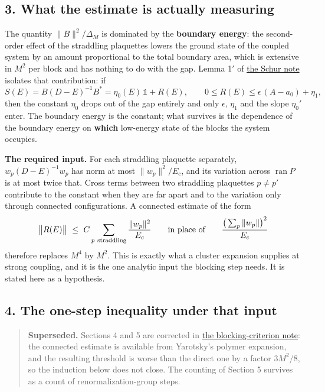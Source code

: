 \documentclass[11pt,a4paper]{article}
\begin{document}
\hypertarget{what-the-estimate-is-actually-measuring}{%
\subsection{3. What the estimate is actually
measuring}\label{what-the-estimate-is-actually-measuring}}

The quantity \(\|B\|^2/\Delta_M\) is dominated by the \textbf{boundary
energy}: the second-order effect of the straddling plaquettes lowers the
ground state of the coupled system by an amount proportional to the
total boundary area, which is extensive in \(M^2\) per block and has
nothing to do with the gap. Lemma 1\('\) of
\href{schur-error-ultraviolet.md}{the Schur note} isolates that
contribution: if \[S(E)=B(D-E)^{-1}B^*=\eta_0(E)\,\mathbb 1+R(E),\qquad
0\le R(E)\le\epsilon\,(A-a_0)+\eta_1,\] then the constant \(\eta_0\)
drops out of the gap entirely and only \(\epsilon\), \(\eta_1\) and the
slope \(\eta_0'\) enter. The boundary energy is the constant; what
survives is the dependence of the boundary energy on \textbf{which}
low-energy state of the blocks the system occupies.

\textbf{The required input.} For each straddling plaquette separately,
\(w_p(D-E)^{-1}w_p\) has norm at most \(\|w_p\|^2/E_c\), and its
variation across \(\operatorname{ran}P\) is at most twice that. Cross
terms between two straddling plaquettes \(p\neq p'\) contribute to the
constant when they are far apart and to the variation only through
connected configurations. A connected estimate of the form
\[\big\|R(E)\big\|\ \le\ C\sum_{p\ \rm straddling}\frac{\|w_p\|^2}{E_c}
\qquad\text{in place of}\qquad
\frac{\big(\sum_p\|w_p\|\big)^2}{E_c}\] therefore replaces \(M^4\) by
\(M^2\). This is exactly what a cluster expansion supplies at strong
coupling, and it is the one analytic input the blocking step needs. It
is stated here as a hypothesis.

\hypertarget{the-one-step-inequality-under-that-input}{%
\subsection{4. The one-step inequality under that
input}\label{the-one-step-inequality-under-that-input}}

\begin{quote}
\textbf{Superseded.} Sections 4 and 5 are corrected in
\href{blocking-criterion-monotone.md}{the blocking-criterion note}: the
connected estimate is available from Yarotsky's polymer expansion, and
the resulting threshold is worse than the direct one by a factor
\(3M^2/8\), so the induction below does not close. The counting of
Section 5 survives as a count of renormalization-group steps.
\end{quote}
\end{document}
